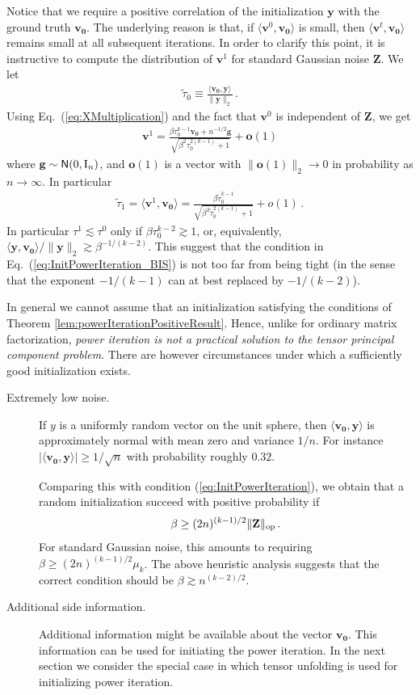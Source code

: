 \documentclass[11pt]{article}
\theoremstyle{definition}
\def\ttau{\tilde{\tau}}
\def\<{\langle}
\def\>{\rangle}
\def\bv{\mathbf{v}}
\def\bo{\mathbf{o}}
\def\bg{\mathbf{g}}
\def\bvz{\mathbf{v_0}}
\def\bZ{\mathbf{Z}}
\def\normal{{\sf N}}
\def\id{{\rm I}}
\def\by{{\mathbf y}}
\begin{document}
Notice that we require a positive correlation of the initialization
$\by$ with the ground truth  $\bvz$. 
The underlying reason is that, if $\<\bv^0,\bvz\>$ is small, then
$\<\bv^t,\bvz\>$  remains small
at all subsequent iterations. In order to clarify this point, it is
instructive to 
compute the distribution of $\bv^1$ for standard Gaussian noise $\bZ$.
We let 
%
\begin{align}
%
\ttau_0 \equiv \frac{\<\bvz,\by\>}{\|\by\|_2}\, .
%
\end{align}
%
Using Eq.~(\ref{eq:XMultiplication}) and the fact that $\bv^0$ is
independent of $\bZ$, we get
%
\begin{align}
%
\bv^{1} = \frac{\beta\tau_0^{k-1}\bvz+ n^{-1/2}\bg
}{\sqrt{\beta^2\tau_0^{2(k-1)} +1}} + \bo(1)
%
\end{align}
%
where $\bg\sim\normal(0,\id_{n})$, and $\bo(1)$ is a vector with
$\|\bo(1)\|_2\to 0$ in probability as $n\to\infty$. 
In particular
%
\begin{align}
%
\ttau_1 = \<\bv^1,\bvz\> = \frac{\beta\ttau_0^{k-1}
}{\sqrt{\beta^2\ttau_0^{2(k-1)} +1}} + o(1)\, .\label{eq:FirstIterationPowerIteration}
%
\end{align}
%
In particular $\tau^1\lesssim \tau^0$ only if
$\beta\tau_0^{k-2}\gtrsim 1$,
or, equivalently, $\<\by,\bvz\>/\|\by\|_2\gtrsim \beta^{-1/(k-2)}$.
This suggest that the condition in
Eq.~(\ref{eq:InitPowerIteration_BIS}) is not too far from being tight
(in the sense that the exponent $-1/(k-1)$ can at best replaced by $-1/(k-2)$).

In general we cannot assume that an
initialization satisfying the conditions of Theorem
\ref{lem:powerIterationPositiveResult}.
Hence, unlike for ordinary matrix factorization,
\emph{power iteration is not a practical solution to the tensor principal
  component problem}. There are however circumstances under which a
sufficiently good initialization exists.
%
\begin{description}
%
\item[Extremely low noise.] If $y$ is a uniformly random vector on the
  unit sphere, then $\<\bvz,\by\>$ is approximately normal with mean
  zero and variance $1/n$. For instance $|\<\bvz,\by\>|\ge 1/\sqrt{n}$
with probability roughly $0.32$.

Comparing this with condition (\ref{eq:InitPowerIteration}), we obtain
that a random initialization succeed with positive probability if
%
\begin{align}
%
\beta\ge (2n)^{(k-1)/2}\|\bZ\|_{\rm op}\,. 
%
\end{align}
%
For standard Gaussian noise, this amounts to requiring $\beta \ge
(2n)^{(k-1)/2}\mu_k$.
The above heuristic analysis suggests that the correct condition
should be  $\beta \gtrsim n^{(k-2)/2}$.
%
\item[Additional side information.] Additional information might be
  available about the vector $\bvz$. This information can be used for
  initiating the power iteration. In the next section we consider the
  special case in which tensor unfolding is used for initializing
  power iteration. 
%
\end{description}
\end{document}
